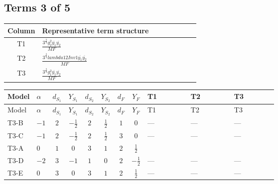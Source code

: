 \documentclass[8pt]{article}
\begin{document}
\begin{landscape}
\subsection*{Terms 3 of 5}
\begin{center}
\begin{tabular}{@{}c >{\raggedright\arraybackslash}p{0.82\linewidth}@{}}
\toprule
Column & Representative term structure \\
\midrule
T1 & \(\displaystyle \frac{3^{\frac{3}{4}} g_{2}^{2} \overline{y_{1}} \overline{y_{2}}}{MF}\) \\
\midrule
T2 & \(\displaystyle \frac{3^{\frac{3}{4}} lambda12Inv1 \overline{y_{1}} \overline{y_{2}}}{MF}\) \\
\midrule
T3 & \(\displaystyle \frac{3^{\frac{3}{4}} g_{1}^{2} \overline{y_{1}} \overline{y_{2}}}{MF}\) \\
\midrule
\bottomrule
\end{tabular}
\end{center}
\smallskip
\tiny
\begin{longtable}{@{}llcccccc >{\raggedright\arraybackslash}p{0.21\linewidth} >{\raggedright\arraybackslash}p{0.21\linewidth} >{\raggedright\arraybackslash}p{0.21\linewidth}@{}}
\toprule
Model & $\alpha$ & $d_{S_1}$ & $Y_{S_1}$ & $d_{S_2}$ & $Y_{S_2}$ & $d_F$ & $Y_F$ & T1 & T2 & T3 \\
\midrule
\endfirsthead
\toprule
Model & $\alpha$ & $d_{S_1}$ & $Y_{S_1}$ & $d_{S_2}$ & $Y_{S_2}$ & $d_F$ & $Y_F$ & T1 & T2 & T3 \\
\midrule
\endhead
T3-B & $-1$ & $2$ & $-\frac{1}{2}$ & $2$ & $\frac{1}{2}$ & $1$ & $0$ & --- & --- & --- \\
\midrule
T3-C & $-1$ & $2$ & $-\frac{1}{2}$ & $2$ & $\frac{1}{2}$ & $3$ & $0$ & --- & --- & --- \\
\midrule
T3-A & $0$ & $1$ & $0$ & $3$ & $1$ & $2$ & $\frac{1}{2}$ & \scriptsize\adjustbox{max width=\linewidth}{$\begin{gathered} - \frac{17 \cdot 3^{\frac{3}{4}} g_{2}^{2} \overline{y_{1}} \overline{y_{2}}}{24 MF}\end{gathered}$} & \scriptsize\adjustbox{max width=\linewidth}{$\begin{gathered} - \frac{3^{\frac{3}{4}} lambda12Inv1 \overline{y_{1}} \overline{y_{2}}}{6 MF}\end{gathered}$} & \scriptsize\adjustbox{max width=\linewidth}{$\begin{gathered} - \frac{3^{\frac{3}{4}} g_{1}^{2} \overline{y_{1}} \overline{y_{2}}}{8 MF}\end{gathered}$} \\
\midrule
T3-D & $-2$ & $3$ & $-1$ & $1$ & $0$ & $2$ & $-\frac{1}{2}$ & --- & --- & --- \\
\midrule
T3-E & $0$ & $3$ & $0$ & $3$ & $1$ & $2$ & $\frac{1}{2}$ & --- & --- & --- \\
\midrule
\bottomrule
\end{longtable}
\clearpage

\end{landscape}
\end{document}

